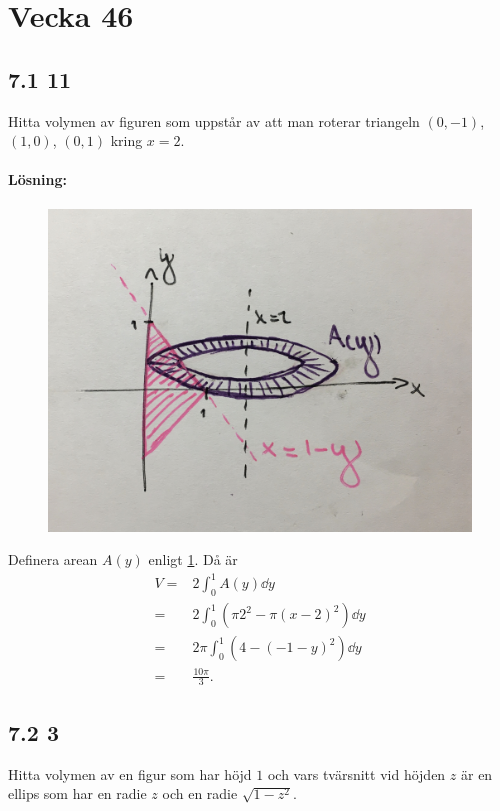 \section{Vecka 46}%
\label{sec:vecka_46}

\subsection{7.1 11}%
\label{sub:7_1_11}

Hitta volymen av figuren som uppstår av att man roterar triangeln $(0, -1)$, $(1, 0)$, $(0, 1)$ kring $x = 2$.

\paragraph{Lösning:}

\begin{figure}[ht]
	\centering
	\includegraphics[width=0.6\linewidth]{figures/rotationsvolym_7_1_11.jpg}
	\caption{}%
	\label{fig:figures/rotationsvolym_7_1_11}
\end{figure}

Definera arean $A(y)$ enligt \cref{fig:figures/rotationsvolym_7_1_11}.
Då är
\begin{align*}
	V ={}& 2 \int_0^1 A(y) \dd{y}\\
	={}& 2 \int_0^1 \left(\pi 2^2 - \pi (x - 2)^2\right) \dd{y}\\
	={}& 2 \pi \int_0^1 \left(4 - (-1 - y)^2\right) \dd{y}\\
	={}& \frac{10 \pi}{3}.
\end{align*}


\subsection{7.2 3}%
\label{sub:7_2_3}

Hitta volymen av en figur som har höjd $1$ och vars tvärsnitt vid höjden $z$ är en ellips som har en radie $z$ och en radie $\sqrt{1 - z^2}$.

